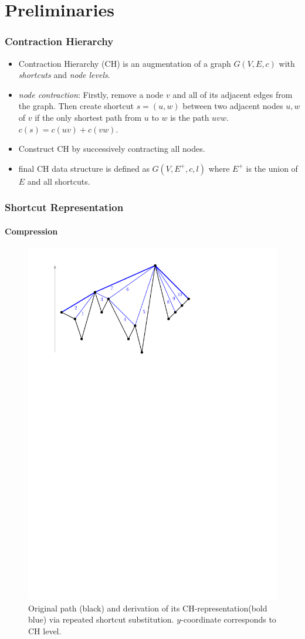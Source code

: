 \documentclass{beamer}
\newcommand{\chrep}{CH-representation\xspace}
\begin{document}
\section{Preliminaries}
\begin{frame}
	\frametitle{Contraction Hierarchy}
	\begin{itemize}
		\item Contraction Hierarchy (CH) is an augmentation of a graph $G(V,E,c)$ with \emph{shortcuts} and \emph{node levels}. \pause
		\item \emph{node contraction}: Firstly, remove a node $v$ and all of its adjacent edges from the graph. \pause
		      Then create shortcut $s = (u, w)$ between two adjacent nodes $u,w$ of $v$ if the only shortest path from $u$ to $w$ is the path $uvw$. $c(s) = c(uv) + c(vw)$.
		\item Construct CH by successively contracting all nodes. \pause
		\item final CH data structure is defined as $G(V, E^+, c, l)$ where $E^+$ is the union of $E$ and all shortcuts.
	\end{itemize}
\end{frame}

\begin{frame}
	\frametitle{Shortcut Representation}
	\framesubtitle{Compression}
	\begin{figure}
		\includegraphics[width=.76\columnwidth]{images/toch}
		\caption{Original path (black) and derivation of its \chrep (bold blue) via repeated shortcut substitution. $y$-coordinate corresponds to CH level.}
	\end{figure}
\end{frame}
\end{document}
